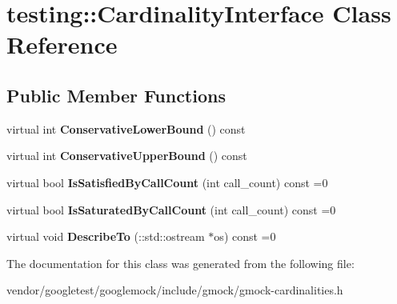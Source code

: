 \hypertarget{classtesting_1_1_cardinality_interface}{}\section{testing\+:\+:Cardinality\+Interface Class Reference}
\label{classtesting_1_1_cardinality_interface}
\subsection*{Public Member Functions}
\begin{DoxyCompactItemize}
\item 
\mbox{\label{classtesting_1_1_cardinality_interface_a1aff90c45ff45658fee99d15fd0a6f89}} 
virtual int {\bfseries Conservative\+Lower\+Bound} () const
\item 
\mbox{\label{classtesting_1_1_cardinality_interface_ac741b28605377d603623dddf4b1c8d33}} 
virtual int {\bfseries Conservative\+Upper\+Bound} () const
\item 
\mbox{\label{classtesting_1_1_cardinality_interface_af89684f4ea6d9de331abf7958754d8f1}} 
virtual bool {\bfseries Is\+Satisfied\+By\+Call\+Count} (int call\+\_\+count) const =0
\item 
\mbox{\label{classtesting_1_1_cardinality_interface_a42508cff9627de2e6f9c1ec33a7d8bf2}} 
virtual bool {\bfseries Is\+Saturated\+By\+Call\+Count} (int call\+\_\+count) const =0
\item 
\mbox{\label{classtesting_1_1_cardinality_interface_a8a93e3bbf24d14fe21186802ecef0929}} 
virtual void {\bfseries Describe\+To} (\+::std\+::ostream $\ast$os) const =0
\end{DoxyCompactItemize}


The documentation for this class was generated from the following file\+:\begin{DoxyCompactItemize}
\item 
vendor/googletest/googlemock/include/gmock/gmock-\/cardinalities.\+h\end{DoxyCompactItemize}
